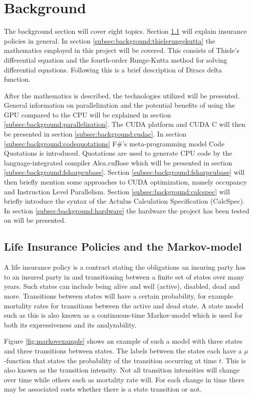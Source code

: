 \section{Background}
The background section will cover eight topics.
Section \ref{subsec:background:lifeinsurance} will explain insurance policies in general.
In section \ref{subsec:background:thielerungekutta} the mathematics employed in this project will be covered. 
This consists of Thiele's differential equation and the fourth-order Runge-Kutta method for solving differential equations.
Following this is a brief description of Diracs delta function.

After the mathematics is described, the technologies utilized will be presented.
General information on parallelization and the potential benefits of using the GPU compared to the CPU will be explained in section \ref{subsec:background:parallelization}.
The CUDA platform and CUDA C will then be presented in section \ref{subsec:background:cudac}.
In section \ref{subsec:background:codequotations} F\#'s meta-programming model Code Quotations is introduced.
Quotations are used to generate CPU code by the language-integrated compiler Alea.cuBase which will be presented in section \ref{subsec:background:fsharpcubase}.
Section \ref{subsec:background:fsharpcubase} will then briefly mention some approaches to CUDA optimization, namely occupancy and Instruction Level Parallelism.
Section \ref{subsec:background:calcspec} will briefly introduce the syntax of the Actulus Calculation Specification (CalcSpec).
In section \ref{subsec:background:hardware} the hardware the project has been tested on will be presented.

\subsection{Life Insurance Policies and the Markov-model}\label{subsec:background:lifeinsurance}
A life insurance policy is a contract stating the obligations an insuring party has to an insured party in and transitioning between a finite set of states over many years.
Such states can include being alive and well (active), disabled, dead and more.
Transitions between states will have a certain probability, for example mortality rates for transitions between the active and dead state.
A state model such as this is also known as a continuous-time Markov-model\cite{norberg2000basic} which is used for both its expressiveness and its analyzability.

Figure \ref{fig:markovexample} shows an example of such a model with three states and three transitions between states. 
The labels between the states each have a $\mu$-function that states the probability of the transition occurring at time $t$. 
This is also known as the transition intensity.
Not all transition intensities will change over time while others such as mortality rate will.
For each change in time there may be associated costs whether there is a state transition or not.

